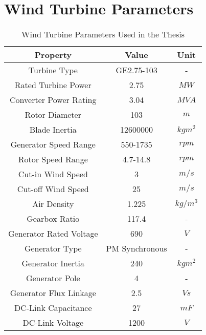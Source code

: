 \chapter{Wind Turbine Parameters}
\label{chp:appendixA}

\begin{table}[h]

		\centering
		\begin{tabular}{ccc}
			\hline
			\textbf{Property}       & \textbf{Value} & \textbf{Unit} \\ \hline
			Turbine Type            & GE2.75-103     & -             \\
			Rated Turbine Power     & 2.75           & $MW$          \\
			Converter Power Rating  & 3.04           & $MVA$         \\
			Rotor Diameter          & 103            & $m$           \\
			Blade Inertia           & 12600000       & $kgm^{2}$     \\
			Generator Speed Range   & 550-1735       & $rpm$         \\
			Rotor Speed Range       & 4.7-14.8       & $rpm$         \\
			Cut-in Wind Speed       & 3              & $m/s$         \\
			Cut-off Wind Speed      & 25             & $m/s$         \\
			Air Density             & 1.225          & $kg/m^{3}$    \\
			Gearbox Ratio           & 117.4          & -             \\
			Generator Rated Voltage & 690            & $V$           \\
			Generator Type          & PM Synchronous & -             \\
			Generator Inertia       & 240            & $kgm^{2}$     \\
			Generator Pole          & 4              & -             \\
			Generator Flux Linkage  & 2.5            & $Vs$          \\
			DC-Link Capacitance     & 27             & $mF$          \\
			DC-Link Voltage         & 1200           & $V$           \\ \hline
		\end{tabular}

	\caption{Wind Turbine Parameters Used in the Thesis}
\end{table}